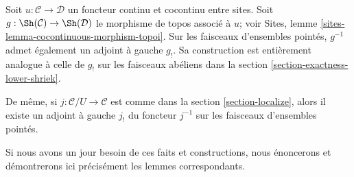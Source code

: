 \medskip\noindent
Soit $u : \mathcal{C} \to \mathcal{D}$ un foncteur continu et cocontinu entre
sites. Soit $g : \Sh(\mathcal{C}) \to \Sh(\mathcal{D})$ le morphisme de topos
associé à $u$; voir Sites,
lemme \ref{sites-lemma-cocontinuous-morphism-topoi}. Sur les faisceaux
d'ensembles pointés, $g^{-1}$ admet également un adjoint à gauche $g_!$. Sa
construction est entièrement analogue à celle de $g_!$ sur les faisceaux
abéliens dans la section \ref{section-exactness-lower-shriek}.

\medskip\noindent
De même, si $j : \mathcal{C}/U \to \mathcal{C}$ est comme dans la
section \ref{section-localize}, alors il existe un adjoint à gauche $j_!$ du
foncteur $j^{-1}$ sur les faisceaux d'ensembles pointés.

\medskip\noindent
Si nous avons un jour besoin de ces faits et constructions, nous énoncerons et
démontrerons ici précisément les lemmes correspondants.












